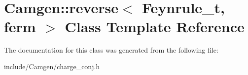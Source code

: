 \hypertarget{a00464}{\section{Camgen\-:\-:reverse$<$ Feynrule\-\_\-t, ferm $>$ Class Template Reference}
\label{a00464}
}


The documentation for this class was generated from the following file\-:\begin{DoxyCompactItemize}
\item 
include/\-Camgen/charge\-\_\-conj.\-h\end{DoxyCompactItemize}

